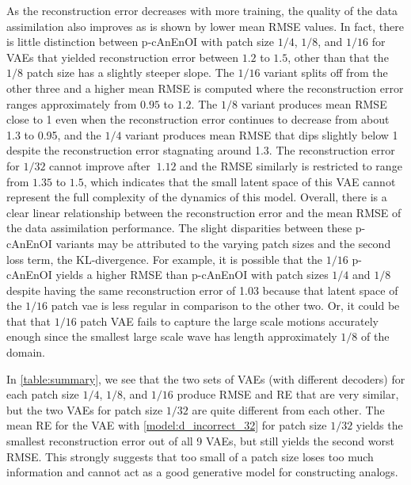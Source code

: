 \documentclass[final,3p]{elsarticle}
\theoremstyle{break}
\begin{document}
As the reconstruction error decreases with more training, the quality of the data assimilation also improves as is shown by lower mean RMSE values.
In fact, there is little distinction between p-cAnEnOI with patch size $1/4$, $1/8$, and $1/16$ for VAEs that yielded reconstruction error between $1.2$ to $1.5$, other than that the $1/8$ patch size has a slightly steeper slope.
The $1/16$ variant splits off from the other three and a higher mean RMSE is computed where the reconstruction error ranges approximately from $0.95$ to $1.2$. 
The $1/8$ variant produces mean RMSE close to 1 even when the reconstruction error continues to decrease from about 1.3 to 0.95, and the $1/4$ variant produces mean RMSE that dips slightly below 1 despite the reconstruction error stagnating around 1.3.
The reconstruction error for $1/32$ cannot improve after $~1.12$ and the RMSE similarly is restricted to range from $1.35$ to $1.5$, which indicates that the small latent space of this VAE cannot represent the full complexity of the dynamics of this model.
Overall, there is a clear linear relationship between the reconstruction error and the mean RMSE of the data assimilation performance.
The slight disparities between these p-cAnEnOI variants may be attributed to the varying patch sizes and the second loss term, the KL-divergence. 
For example, it is possible that the $1/16$ p-cAnEnOI yields a higher RMSE than p-cAnEnOI with patch sizes $1/4$ and $1/8$ despite having the same reconstruction error of 1.03 because that latent space of the $1/16$ patch vae is less regular in comparison to the other two.
Or, it could be that that $1/16$ patch VAE fails to capture the large scale motions accurately enough since the smallest large scale wave has length approximately $1/8$ of the domain.\par

In \cref{table:summary}, we see that the two sets of VAEs (with different decoders) for each patch size $1/4$, $1/8$, and $1/16$ produce RMSE and RE that are very similar, but the two VAEs for patch size $1/32$ are quite different from each other.
The mean RE for the VAE with \cref{model:d_incorrect_32} for patch size $1/32$ yields the smallest reconstruction error out of all 9 VAEs, but still yields the second worst RMSE.
This strongly suggests that too small of a patch size loses too much information and cannot act as a good generative model for constructing analogs.
\end{document}
